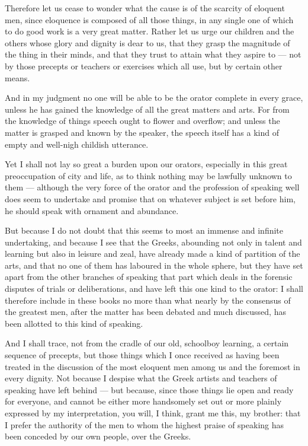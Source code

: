  Therefore let us cease to wonder what the cause is of the scarcity of eloquent men, since eloquence is composed of all those things, in any single one of which to do good work is a very great matter. Rather let us urge our children and the others whose glory and dignity is dear to us, that they grasp the magnitude of the thing in their minds, and that they trust to attain what they aspire to — not by those precepts or teachers or exercises which all use, but by certain other means.

 And in my judgment no one will be able to be the orator complete in every grace, unless he has gained the knowledge of all the great matters and arts. For from the knowledge of things speech ought to flower and overflow; and unless the matter is grasped and known by the speaker, the speech itself has a kind of empty and well-nigh childish utterance.

 Yet I shall not lay so great a burden upon our orators, especially in this great preoccupation of city and life, as to think nothing may be lawfully unknown to them — although the very force of the orator and the profession of speaking well does seem to undertake and promise that on whatever subject is set before him, he should speak with ornament and abundance.

 But because I do not doubt that this seems to most an immense and infinite undertaking, and because I see that the Greeks, abounding not only in talent and learning but also in leisure and zeal, have already made a kind of partition of the arts, and that no one of them has laboured in the whole sphere, but they have set apart from the other branches of speaking that part which deals in the forensic disputes of trials or deliberations, and have left this one kind to the orator: I shall therefore include in these books no more than what nearly by the consensus of the greatest men, after the matter has been debated and much discussed, has been allotted to this kind of speaking.

 And I shall trace, not from the cradle of our old, schoolboy learning, a certain sequence of precepts, but those things which I once received as having been treated in the discussion of the most eloquent men among us and the foremost in every dignity. Not because I despise what the Greek artists and teachers of speaking have left behind — but because, since those things lie open and ready for everyone, and cannot be either more handsomely set out or more plainly expressed by my interpretation, you will, I think, grant me this, my brother: that I prefer the authority of the men to whom the highest praise of speaking has been conceded by our own people, over the Greeks.

